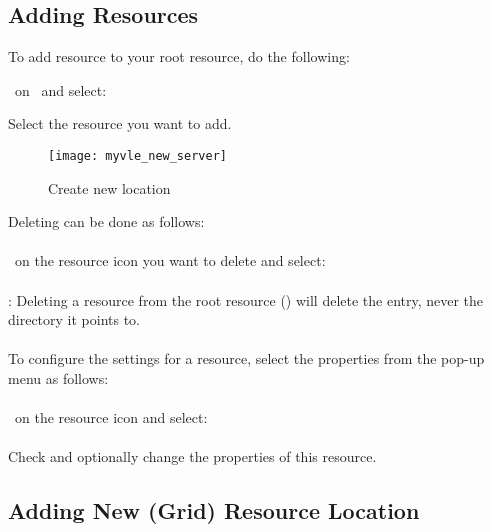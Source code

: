\subsection{Adding Resources} 
\label{section:adding_resources} 

 To add resource to your root resource, do the following:

	\step \rightclick\ on \myvle\ and select:
	
	\step Select the resource you want to add. 


 \begin{figure}[htbp]
 \centerline{\texttt{[image: myvle\_new\_server]}}
 \caption{Create new location}
 \label{fig:myvle_new_server}
 \end{figure}

Deleting can be done as follows:\\
\\
\step \rightclick\ on the resource icon you want to delete and 
select:\\ 
\\
: Deleting a resource from the root resource (\myvle) will delete
the entry, never the directory it points to.\\
\\
To configure the settings for a resource, select the properties from the
pop-up menu as follows:\\
\\
\step \rightclick\ on the resource icon and select:\\
\\
Check and optionally change the properties of this resource.
	
\subsection{Adding New (Grid) Resource Location} 
\label{section:adding_gftp_server}
 
